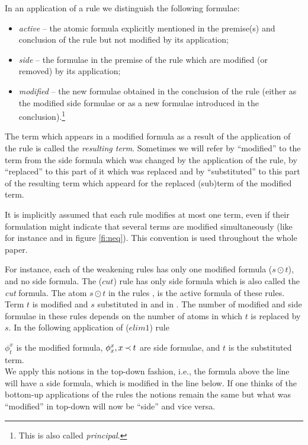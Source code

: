 \begin{DEFINITION} In an application of a rule we distinguish the following
formulae:
\begin{itemize}\MyLPar
\item {\em active} -- the atomic formula explicitly mentioned in the premise(s)
and conclusion of the rule but not modified by its application;
\item {\em side} -- the formulae in the premise of the rule which are modified
(or removed) by its application;
\item {\em modified} -- the new formulae obtained in the conclusion of the rule
(either as the modified side formulae or as a new formulae introduced in the 
conclusion).\footnote{This is also called {\em principal}.}
\end{itemize}
\end{DEFINITION}
\noindent
The term which appears in a modified formula as a 
result of the application of the rule is called the {\em resulting
term}. Sometimes we will refer by ``modified'' to the term from the side
formula which was changed by the application of the rule, by 
``replaced'' to this part of it which was replaced and by ``substituted'' 
to this part of the resulting term which appeard for the replaced 
(sub)term of the modified term.

It is implicitly assumed that each rule modifies at most one term, even if
their formulation might indicate that several terms are modified
simultaneously (like for instance  and  in figure \ref{fi:neq}). This
convention is used throughout the whole paper.
\begin{EXAMPLE}
For instance, each of the weakening rules 
has only one modified formula ($s\odot t$), and no side formula.
The ($cut$) rule  has only side formula which is
also called the {\em cut} formula. The atom $s\odot t$ in the rules , 
 is the active formula of these rules. 
Term $t$ is modified and $s$ substituted in
 and in . The number of modified and side formulae in
these rules depends on the number of atoms in which $t$ is replaced by $s$. 
In the following application of ($elim1$) rule 
\begin{center}
\end{center}
\noindent $\phi_t^x$ is the modified formula, $\phi_x^x, x\mathbin{\prec} t$ are side formulae, 
and $t$ is the substituted term.\\
We apply this notions in the top-down fashion, i.e., the formula above the
line will have a side formula, which is modified in the line below.
If one thinks of the bottom-up applications of the rules the notions remain the same but
what was ``modified'' in top-down will now be ``side'' and vice versa.
\end{EXAMPLE}


